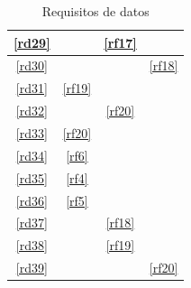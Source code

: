 \documentclass[12pt,a4paper]{article}
\begin{document}
\begin{table}[H]
\begin{center}
\begin{tabular}{|c|c|c|c|}
\hline
	\ref{rd29} &  & \ref{rf17} & \\
\hline
	\ref{rd30} &  &  & \ref{rf18} \\
\hline
	\ref{rd31} & \ref{rf19} &  & \\
\hline
	\ref{rd32} &  & \ref{rf20} & \\
\hline
	\ref{rd33} & \ref{rf20} &  & \\
\hline
	\ref{rd34} & \ref{rf6} &  & \\
\hline
	\ref{rd35} & \ref{rf4} &  & \\
\hline
	\ref{rd36} & \ref{rf5} &  & \\
\hline
	\ref{rd37} &  & \ref{rf18} & \\
\hline
	\ref{rd38} &  & \ref{rf19} & \\
\hline
	\ref{rd39} &  & & \ref{rf20} \\
\hline
\end{tabular}
\end{center}
\caption{Requisitos de datos}
\end{table}
\end{document}
